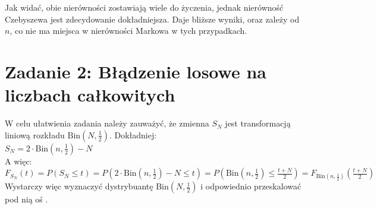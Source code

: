 \documentclass{article}
\begin{document}
Jak widać, obie nierówności zostawiają wiele do życzenia, jednak nierówność Czebyszewa jest zdecydowanie dokładniejsza.
Daje bliższe wyniki, oraz zależy od \( n \), co nie ma miejsca w nierówności Markowa w tych przypadkach.\\

\section*{Zadanie 2: Błądzenie losowe na liczbach całkowitych}

W celu ułatwienia zadania należy zauważyć, że zmienna \( S_N \) jest transformacją liniową rozkładu \( \text{Bin}\left(N, \frac{1}{2}\right) \).
Dokładniej: \\
\( S_N = 2 \cdot \text{Bin}\left(n, \frac{1}{2}\right) - N \)\\
A więc: \\
\( F_{S_N}\left(t\right) = P\left(S_N \leq t\right) = P\left(2 \cdot \text{Bin}\left(n, \frac{1}{2}\right) - N \leq t\right) = P\left(\text{Bin}\left(n, \frac{1}{2}\right) \leq \frac{t + N}{2}\right) = F_{\text{Bin}\left(n, \frac{1}{2}\right)}\left(\frac{t + N}{2}\right) \)\\
Wystarczy więc wyznaczyć dystrybuantę \( \text{Bin}\left(N, \frac{1}{2}\right) \) i odpowiednio przeskalować pod nią oś .
\end{document}
